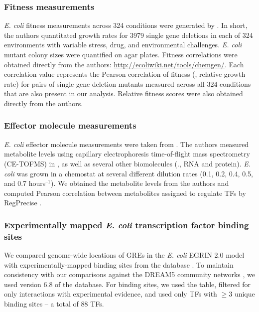 \subsubsection{Fitness measurements}
\label{section:fitness}

{\it E. coli} fitness measurements across 324 conditions were
generated by \cite{Nichols2011}. In short, the authors quantitated
growth rates for 3979 single gene deletions in each of 324
environments with variable stress, drug, and environmental
challenges. \textit{E. coli} mutant colony sizes were quantified on
agar plates.  Fitness correlations were obtained directly from the
authors: \href{http://ecoliwiki.net/tools/chemgen/}{http://ecoliwiki.net/tools/chemgen/}. Each
correlation value represents the Pearson correlation of fitness (\ie,
relative growth rate) for pairs of single gene deletion mutants
measured across all 324 conditions that are also present in our
analysis. Relative fitness scores were also obtained directly from the
authors.

\subsubsection{Effector molecule measurements}

{\it E. coli} effector molecule measurements were taken
from \cite{Ishii2007}. The authors measured metabolite levels using
capillary electrophoresis time-of-flight mass spectrometry (CE-TOFMS)
in \eco, as well as several other biomolecules (\eg., RNA and
protein). \textit{E. coli} was grown in a chemostat at several
different dilution rates (0.1, 0.2, 0.4, 0.5, and 0.7
hours$^{–1}$). We obtained the metabolite levels from the authors and
computed Pearson correlation between metabolites assigned to regulate
TFs by RegPrecise \cite{Novichkov2010}.

\subsubsection{Experimentally mapped {\it E. coli} transcription factor binding sites}

We compared genome-wide locations of GREs in the {\it E. coli} EGRIN
2.0 model with experimentally-mapped binding sites from the \rdb
database \cite{Gama-Castro2011}. To maintain consistency with our
comparisons against the DREAM5 community networks \cite{Marbach2012},
we used version 6.8 of the database. For binding sites, we used the
{} table, filtered for only interactions with
experimental evidence, and used only TFs with $\geq 3$ unique binding
sites -- a total of 88 TFs.

